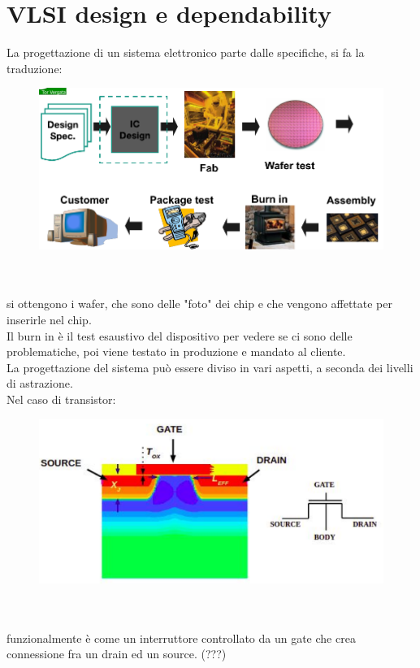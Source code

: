\documentclass[oneside, 12pt]{extbook}
\begin{document}
\section{VLSI design e dependability}
La progettazione di un sistema elettronico parte dalle specifiche, si fa la traduzione:\\
\begin{figure}[!h]
	\includegraphics[scale=.5]{immagini/hardware/vlsi_design.png}
\end{figure}
\\\\si ottengono i wafer, che sono delle "foto" dei chip e che vengono affettate per inserirle nel chip.
\\Il burn in è il test esaustivo del dispositivo per vedere se ci sono delle problematiche, poi viene testato in produzione e mandato al cliente.
\\La progettazione del sistema può essere diviso in vari aspetti, a seconda dei livelli di astrazione.
\\Nel caso di transistor:\\
\begin{figure}[!h]
	\includegraphics[scale=0.5]{immagini/hardware/transistor.png}
\end{figure}
\\\\funzionalmente è come un interruttore controllato da un gate che crea connessione fra un drain ed un source. (???)
\end{document}
